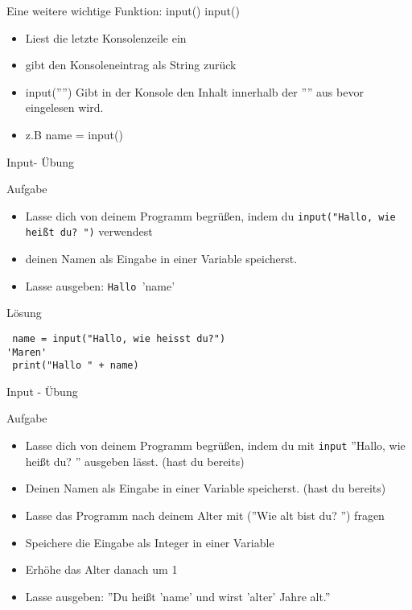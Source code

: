 \begin{frame}[fragile]{Eine weitere wichtige Funktion: input()}
input()
\begin{itemize}
\item Liest die letzte Konsolenzeile ein
\item gibt den Konsoleneintrag als String zurück
\item input('''') Gibt in der Konsole den Inhalt innerhalb der '''' aus bevor eingelesen wird.
\item z.B name = input() 
\end{itemize}
\end{frame}

\begin{frame}[fragile]{Input- Übung}   
\begin{block}{Aufgabe}
\begin{itemize}


\item Lasse dich von deinem Programm begrüßen, indem du
  \texttt{input("Hallo, wie heißt du? ")} verwendest
\item deinen Namen als Eingabe in einer Variable speicherst. 
\item Lasse ausgeben: \texttt{Hallo }'name'
\end{itemize}
\end{block}
\pause{}
\begin{exampleblock}{Lösung}
\begin{lstlisting}
 name = input("Hallo, wie heisst du?")
'Maren'
 print("Hallo " + name)
\end{lstlisting}
\end{exampleblock}
\end{frame}

\begin{frame}[fragile]{Input - Übung}   
\begin{block}{Aufgabe}
	\begin{itemize}
		\item Lasse dich von deinem Programm begrüßen, indem du mit \texttt{input} ''Hallo, wie heißt du? '' ausgeben lässt. (hast du bereits)
		\item Deinen Namen als Eingabe in einer Variable speicherst. (hast du bereits)
		\item Lasse das Programm nach deinem Alter mit (''Wie alt bist du? '') fragen
		\item Speichere die Eingabe als Integer in einer Variable 
		\item Erhöhe das Alter danach um 1
		\item Lasse ausgeben: ''Du heißt 'name' und wirst 'alter' Jahre alt.''
	\end{itemize}
\end{block}
\end{frame}

